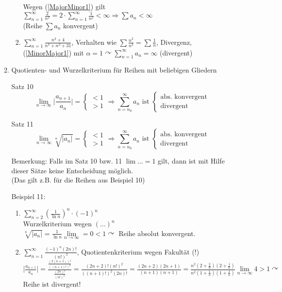 \documentclass[a4paper]{scrartcl}
\begin{document}
\begin{enumerate}
\begin{enumerate}
\begin{enumerate}
Wegen (\ref{MajorMinor1}) gilt $\sum\limits_{n=1}^{\infty} \frac{2}{n^2} = 2 \cdot \sum\limits_{n=1}^{\infty} \frac{1}{n^2} < \infty \Rightarrow \sum a_n < \infty$\\
(Reihe $\sum a_n$ konvergent)

\item $\sum\limits_{n=1}^{\infty} \frac{n^2 +4}{n^3 + n^2 + 31}$, Verhalten wie $\sum \frac{n^2}{n^3} = \sum \frac{1}{n}$, Divergenz, (\ref{MinorMajor1}) mit $\alpha = 1 \curvearrowright \sum\limits_{n=1}^{\infty} a_n = \infty$ (divergent)

\end{enumerate}

\item Quotienten- und Wurzelkriterium für Reihen mit beliebigen Gliedern

Satz 10
\[\lim\limits_{n \to \infty} \lvert \frac{a_{n+1}}{a_n} \rvert = \left\{ \begin{array}{c} <1 \\ >1 \end{array} \right. \Rightarrow \sum\limits_{n=n_0}^{\infty} a_n \text{ ist } \left\{ \begin{array}{c} \text{abs. konvergent} \\ \text{divergent} \end{array} \right. \]

Satz 11
\[\lim\limits_{n \to \infty} \sqrt[n]{\lvert a_n \rvert} = \left\{ \begin{array}{c} <1 \\ >1 \end{array} \right. \Rightarrow \sum\limits_{n=n_0}^{\infty} a_n \text{ ist } \left\{ \begin{array}{c} \text{abs. konvergent} \\ \text{divergent} \end{array} \right. \]

Bemerkung: Falls im Satz 10 bzw. 11 $\lim \dots = 1$ gilt, dann ist mit Hilfe dieser Sätze keine Entscheidung möglich.\\
(Das gilt z.B. für die Reihen aus Beispiel 10)

Beispiel 11:
\begin{enumerate}
\item $\sum\limits_{n=2}^{\infty} ( \frac{1}{\ln{n}} )^n \cdot (-1)^n $\\
Wurzelkriterium wegen $(\dots )^n$\\
$\sqrt[n]{\lvert a_n \rvert} = \frac{1}{\ln{n}} \lim\limits_{n \to \infty} =  0 < 1 \curvearrowright$ Reihe absolut konvergent.
\item $\sum\limits_{n=1}^{\infty} \frac{(-1)^n (2n)!}{(n!)^2}$, Quotientenkriterium wegen Fakultät (!)\\
$\lvert \frac{a_{n+1}}{a_n} \rvert = \frac{\frac{(2(n+1))!}{((n+1)!)^2}}{\frac{(2n)!}{(n!)^2}} = \frac{(2n +2)! (n!)^2}{((n+1)!)^2 (2n)!} = \frac{(2n+2)(2n+1)}{(n+1)(n+1)} = \frac{n^2 (2+ \frac{2}{n}) (2+ \frac{1}{n})}{n^2 (1+ \frac{1}{n} ) (1 + \frac{1}{n} ) } \lim\limits_{n \to \infty} 4> 1 \curvearrowright $ Reihe ist divergent!
\end{enumerate}


\end{enumerate}
\end{enumerate}
\end{document}
